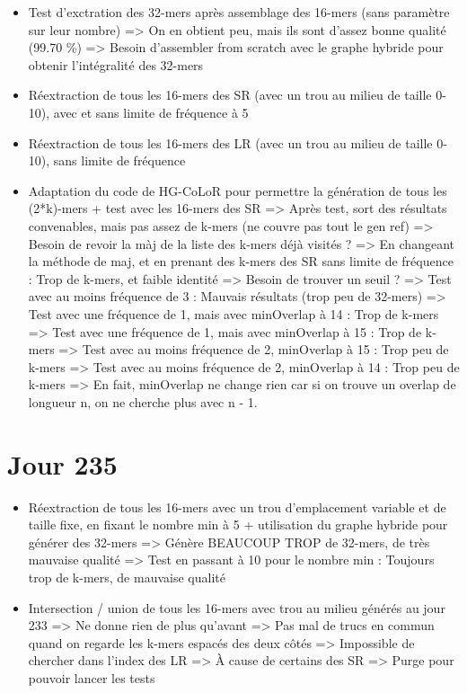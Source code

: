 \documentclass[12pt]{report}
\begin{document}
\begin{itemize}
	\item Test d'exctration des 32-mers après assemblage des 16-mers (sans paramètre sur leur nombre) => On
		  en obtient peu, mais ils sont d'assez bonne qualité (99.70 \%)
		  => Besoin d'assembler from scratch avec le graphe hybride pour obtenir l'intégralité des 32-mers
		  
	\item Réextraction de tous les 16-mers des SR (avec un trou au milieu de taille 0-10), avec et sans limite
		  de fréquence à 5
		  
	\item Réextraction de tous les 16-mers des LR (avec un trou au milieu de taille 0-10), sans limite
		  de fréquence		  
		  
	\item Adaptation du code de HG-CoLoR pour permettre la génération de tous les (2*k)-mers + test avec les 16-mers des SR
			=> Après test, sort des résultats convenables, mais pas assez de k-mers (ne couvre pas tout le gen ref)
			=> Besoin de revoir la màj de la liste des k-mers déjà visités ?
			=> En changeant la méthode de maj, et en prenant des k-mers des SR sans limite de fréquence : Trop de k-mers,
			   et faible identité
			   => Besoin de trouver un seuil ?
			   => Test avec au moins fréquence de 3 : Mauvais résultats (trop peu de 32-mers)
			   => Test avec une fréquence de 1, mais avec minOverlap à 14 : Trop de k-mers
			   => Test avec une fréquence de 1, mais avec minOverlap à 15 : Trop de k-mers
			   => Test avec au moins fréquence de 2, minOverlap à 15 : Trop peu de k-mers
			   => Test avec au moins fréquence de 2, minOverlap à 14 : Trop peu de k-mers
			   => En fait, minOverlap ne change rien car si on trouve un overlap de longueur n, on ne cherche plus
			   	  avec n - 1.
\end{itemize}

\section{Jour 235}

\begin{itemize}
	\item Réextraction de tous les 16-mers avec un trou d'emplacement variable et de taille fixe, en fixant le nombre min à 5
		  + utilisation du graphe hybride pour générer des 32-mers => Génère BEAUCOUP TROP de 32-mers, de très mauvaise qualité
		  => Test en passant à 10 pour le nombre min : Toujours trop de k-mers, de mauvaise qualité
		  
	\item Intersection / union de tous les 16-mers avec trou au milieu générés au jour 233 => Ne donne rien de plus qu'avant
		  => Pas mal de trucs en commun quand on regarde les k-mers espacés des deux côtés
		  => Impossible de chercher dans l'index des LR => À cause de certains des SR => Purge pour pouvoir lancer les tests
\end{itemize}
\end{document}
